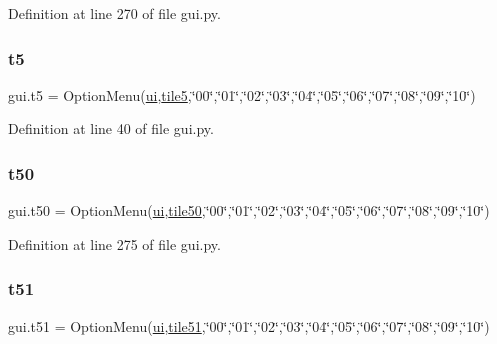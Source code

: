 Definition at line 270 of file gui.\+py.

\mbox{\label{namespacegui_aa419ddc0f716e4a7e34799767b91e399}} 
\subsubsection{\texorpdfstring{t5}{t5}}
{\footnotesize\ttfamily gui.\+t5 = Option\+Menu(\mbox{\hyperlink{namespacegui_a40ab7281456eadbea2dc2038f5c24fa1}{ui}},\mbox{\hyperlink{namespacegui_a9ed659ae603b4cb1b13bec5703143c39}{tile5}},\char`\"{}00\char`\"{},\char`\"{}01\char`\"{},\char`\"{}02\char`\"{},\char`\"{}03\char`\"{},\char`\"{}04\char`\"{},\char`\"{}05\char`\"{},\char`\"{}06\char`\"{},\char`\"{}07\char`\"{},\char`\"{}08\char`\"{},\char`\"{}09\char`\"{},\char`\"{}10\char`\"{})}



Definition at line 40 of file gui.\+py.

\mbox{\label{namespacegui_a361e7bafb1cca2723c0d9006df7f314c}} 
\subsubsection{\texorpdfstring{t50}{t50}}
{\footnotesize\ttfamily gui.\+t50 = Option\+Menu(\mbox{\hyperlink{namespacegui_a40ab7281456eadbea2dc2038f5c24fa1}{ui}},\mbox{\hyperlink{namespacegui_aaaa7bd00c74fe95ffd396a2280fe1bcd}{tile50}},\char`\"{}00\char`\"{},\char`\"{}01\char`\"{},\char`\"{}02\char`\"{},\char`\"{}03\char`\"{},\char`\"{}04\char`\"{},\char`\"{}05\char`\"{},\char`\"{}06\char`\"{},\char`\"{}07\char`\"{},\char`\"{}08\char`\"{},\char`\"{}09\char`\"{},\char`\"{}10\char`\"{})}



Definition at line 275 of file gui.\+py.

\mbox{\label{namespacegui_a8e94b651f603f64070b4f7fd8dedb0c7}} 
\subsubsection{\texorpdfstring{t51}{t51}}
{\footnotesize\ttfamily gui.\+t51 = Option\+Menu(\mbox{\hyperlink{namespacegui_a40ab7281456eadbea2dc2038f5c24fa1}{ui}},\mbox{\hyperlink{namespacegui_ad2c1b5064cba842f7abd0322229ca355}{tile51}},\char`\"{}00\char`\"{},\char`\"{}01\char`\"{},\char`\"{}02\char`\"{},\char`\"{}03\char`\"{},\char`\"{}04\char`\"{},\char`\"{}05\char`\"{},\char`\"{}06\char`\"{},\char`\"{}07\char`\"{},\char`\"{}08\char`\"{},\char`\"{}09\char`\"{},\char`\"{}10\char`\"{})}



